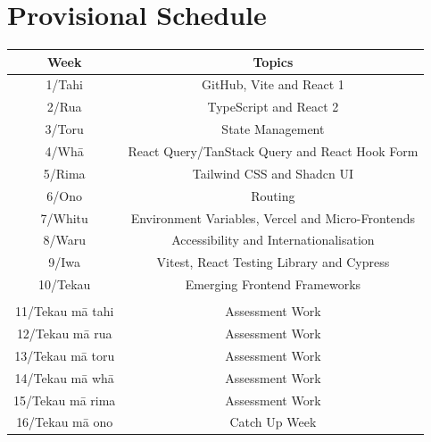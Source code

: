 \documentclass{article}
\begin{document}
\section*{Provisional Schedule}
\renewcommand{\arraystretch}{1.5}
\begin{tabular}{|c|c|c|}
	\hline
	\textbf{Week}                  & \multicolumn{2}{c|}{\textbf{Topics}}                                                                                             \\ \hline
	1/Tahi           & \multicolumn{2}{c|}{GitHub, Vite and React 1}    \\ \hline
	2/Rua            & \multicolumn{2}{c|}{TypeScript and React 2}                   \\ \hline
	3/Toru           & \multicolumn{2}{c|}{State Management} \\ \hline
	4/Whā            & \multicolumn{2}{c|}{React Query/TanStack Query and React Hook Form}                               \\ \hline
	5/Rima           & \multicolumn{2}{c|}{Tailwind CSS and Shadcn UI}                                                \\ \hline
	6/Ono            & \multicolumn{2}{c|}{Routing}                                                   \\ \hline
	7/Whitu          &  \multicolumn{2}{c|}{Environment Variables, Vercel and Micro-Frontends}                            \\ \hline
	8/Waru           & \multicolumn{2}{c|}{Accessibility and Internationalisation}                                                    \\ \hline
	9/Iwa            & \multicolumn{2}{c|}{Vitest, React Testing Library and Cypress}                                                                 \\ \hline
	10/Tekau         & \multicolumn{2}{c|}{Emerging Frontend Frameworks}                                                                 \\ \hline
	\rowcolor{yellow} \multicolumn{3}{|c|}{Mid Semester Break}                                                                                                                          \\ \hline
	11/Tekau mā tahi & \multicolumn{2}{c|}{Assessment Work}                                                                \\ \hline
	12/Tekau mā rua  & \multicolumn{2}{c|}{Assessment Work}                                                                 \\ \hline
	13/Tekau mā toru & \multicolumn{2}{c|}{Assessment Work}                                                     \\ \hline
	14/Tekau mā whā  & \multicolumn{2}{c|}{Assessment Work} \\ \hline 
	15/Tekau mā rima & \multicolumn{2}{c|}{Assessment Work}                                                       \\ \hline
	16/Tekau mā ono  & \multicolumn{2}{c|}{Catch Up Week}                                                         \\ \hline
\end{tabular} 
\end{document}
